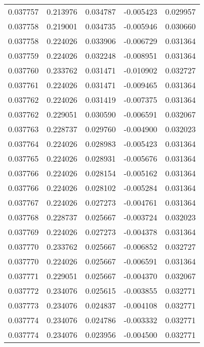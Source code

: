 \begin{tabular}{lrrrr}
0.037757    &  0.213976 &  0.034787 & -0.005423 &             0.029957 \\
0.037758    &  0.219001 &  0.034735 & -0.005946 &             0.030660 \\
0.037758    &  0.224026 &  0.033906 & -0.006729 &             0.031364 \\
0.037759    &  0.224026 &  0.032248 & -0.008951 &             0.031364 \\
0.037760    &  0.233762 &  0.031471 & -0.010902 &             0.032727 \\
0.037761    &  0.224026 &  0.031471 & -0.009465 &             0.031364 \\
0.037762    &  0.224026 &  0.031419 & -0.007375 &             0.031364 \\
0.037762    &  0.229051 &  0.030590 & -0.006591 &             0.032067 \\
0.037763    &  0.228737 &  0.029760 & -0.004900 &             0.032023 \\
0.037764    &  0.224026 &  0.028983 & -0.005423 &             0.031364 \\
0.037765    &  0.224026 &  0.028931 & -0.005676 &             0.031364 \\
0.037766    &  0.224026 &  0.028154 & -0.005162 &             0.031364 \\
0.037766    &  0.224026 &  0.028102 & -0.005284 &             0.031364 \\
0.037767    &  0.224026 &  0.027273 & -0.004761 &             0.031364 \\
0.037768    &  0.228737 &  0.025667 & -0.003724 &             0.032023 \\
0.037769    &  0.224026 &  0.027273 & -0.004378 &             0.031364 \\
0.037770    &  0.233762 &  0.025667 & -0.006852 &             0.032727 \\
0.037770    &  0.224026 &  0.025667 & -0.006591 &             0.031364 \\
0.037771    &  0.229051 &  0.025667 & -0.004370 &             0.032067 \\
0.037772    &  0.234076 &  0.025615 & -0.003855 &             0.032771 \\
0.037773    &  0.234076 &  0.024837 & -0.004108 &             0.032771 \\
0.037774    &  0.234076 &  0.024786 & -0.003332 &             0.032771 \\
0.037774    &  0.234076 &  0.023956 & -0.004500 &             0.032771 \\

\end{tabular}
